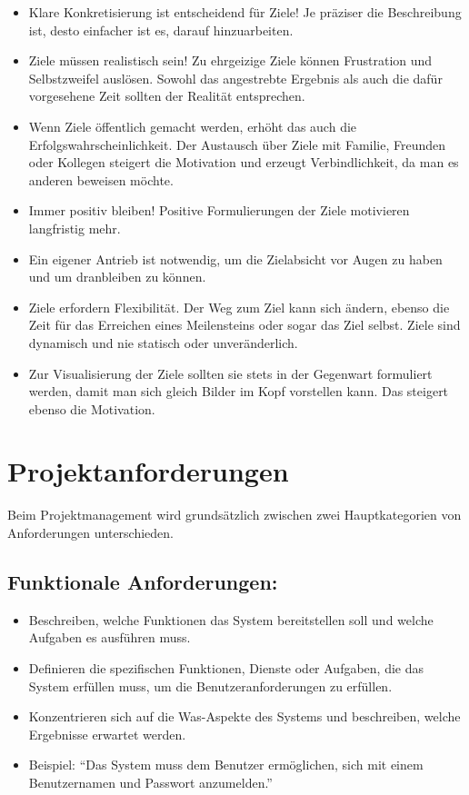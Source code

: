 \begin{itemize}
    \item Klare Konkretisierung ist entscheidend für Ziele! Je präziser die Beschreibung ist, desto einfacher
          ist es, darauf hinzuarbeiten.
    \item Ziele müssen realistisch sein! Zu ehrgeizige Ziele können Frustration und Selbstzweifel
          auslösen. Sowohl das angestrebte Ergebnis als auch die dafür vorgesehene Zeit sollten der Realität
          entsprechen.
    \item Wenn Ziele öffentlich gemacht werden, erhöht das auch die Erfolgswahrscheinlichkeit. Der Austausch
          über Ziele mit Familie, Freunden oder Kollegen steigert die Motivation und erzeugt Verbindlichkeit, da
          man es anderen beweisen möchte.
    \item Immer positiv bleiben! Positive Formulierungen der Ziele motivieren langfristig mehr.
    \item Ein eigener Antrieb ist notwendig, um die Zielabsicht vor Augen zu haben und um dranbleiben zu
          können.
    \item Ziele erfordern Flexibilität. Der Weg zum Ziel kann sich ändern, ebenso die Zeit für das Erreichen
          eines Meilensteins oder sogar das Ziel selbst. Ziele sind dynamisch und nie statisch oder unveränderlich.
    \item Zur Visualisierung der Ziele sollten sie stets in der Gegenwart formuliert werden, damit man sich
          gleich Bilder im Kopf vorstellen kann. Das steigert ebenso die Motivation.
\end{itemize}

\section{Projektanforderungen}

Beim Projektmanagement wird grundsätzlich zwischen zwei Hauptkategorien von Anforderungen unterschieden.

\subsection{Funktionale Anforderungen:}
\begin{itemize}
  \item Beschreiben, welche Funktionen das System bereitstellen soll und welche Aufgaben es ausführen muss.
  \item Definieren die spezifischen Funktionen, Dienste oder Aufgaben, die das System erfüllen muss, um die Benutzeranforderungen zu erfüllen.
  \item Konzentrieren sich auf die Was-Aspekte des Systems und beschreiben, welche Ergebnisse erwartet werden.
  \item Beispiel: "`Das System muss dem Benutzer ermöglichen, sich mit einem Benutzernamen und Passwort anzumelden."'
\end{itemize}

